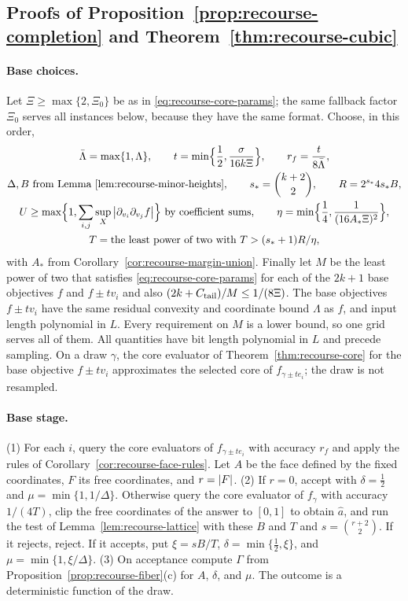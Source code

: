 \subsection{Proofs of Proposition~\ref{prop:recourse-completion} and Theorem~\ref{thm:recourse-cubic}}
\label{app:recourse-cubic-proof}

\paragraph{Base choices.}
Let $\Xi\ge\max\{2,\Xi_0\}$ be as in \eqref{eq:recourse-core-params};
the same fallback factor $\Xi_0$ serves all instances below, because
they have the same format. Choose, in this order,
\begin{gather*}
 \bar\Lambda=\max\{1,\Lambda\},\qquad
 t=\min\Bigl\{\frac12,\frac{\sigma}{16k\Xi}\Bigr\},\qquad
 r_f=\frac t{8\bar\Lambda},\\
 \Delta,B\ \text{from Lemma~\ref{lem:recourse-minor-heights}},\qquad
 s_*=\binom{k+2}2,\qquad R=2^{s_*}4s_*B,\\
 U\ge\max\Bigl\{1,\sum_{i,j}\sup_X\left\lvert\partial_{v_i}\partial_{v_j}f\right\rvert\Bigr\}
 \ \text{by coefficient sums},\qquad
 \eta=\min\Bigl\{\frac14,\frac1{(16A_*\Xi)^2}\Bigr\},\\
 T=\text{the least power of two with }T>(s_*+1)R/\eta,
\end{gather*}
with $A_*$ from Corollary~\ref{cor:recourse-margin-union}. Finally let
$M$ be the least power of two that satisfies \eqref{eq:recourse-core-params}
for each of the $2k+1$ base objectives $f$ and $f\pm tv_i$ and also
$(2k+C_{\rm tail})/M\le1/(8\Xi)$. The base objectives $f\pm tv_i$ have
the same residual convexity and coordinate bound $\Lambda$ as $f$, and
input length polynomial in $L$. Every requirement on $M$ is a lower
bound, so one grid serves all of them. All quantities have bit length
polynomial in $L$ and precede sampling. On a draw $\gamma$, the core
evaluator of Theorem~\ref{thm:recourse-core} for the base objective
$f\pm tv_i$ approximates the selected core of $f_{\gamma\pm te_i}$; the
draw is not resampled.

\paragraph{Base stage.}
(1) For each $i$, query the core evaluators of $f_{\gamma\pm te_i}$ with
accuracy $r_f$ and apply the rules of
Corollary~\ref{cor:recourse-face-rules}. Let $A$ be the face defined by
the fixed coordinates, $F$ its free coordinates, and $r=\left\lvert F\right\rvert$.
(2) If $r=0$, accept with $\delta=\frac12$ and $\mu=\min\{1,1/\Delta\}$.
Otherwise query the core evaluator of $f_\gamma$ with accuracy $1/(4T)$,
clip the free coordinates of the answer to $[0,1]$ to obtain $\hat a$,
and run the test of Lemma~\ref{lem:recourse-lattice} with these $B$ and
$T$ and $s=\binom{r+2}2$. If it rejects, reject. If it accepts, put
$\xi=sB/T$, $\delta=\min\{\frac12,\xi\}$, and $\mu=\min\{1,\xi/\Delta\}$.
(3) On acceptance compute $\Gamma$ from
Proposition~\ref{prop:recourse-fiber}(c) for $A$, $\delta$, and $\mu$.
The outcome is a deterministic function of the draw.

